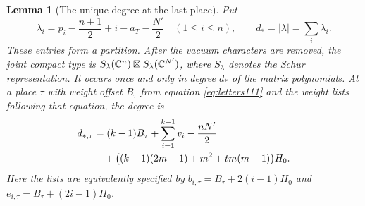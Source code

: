 \documentclass[a4paper,11pt]{article}
\newtheorem{lemma}[proposition]{Lemma}
\theoremstyle{definition}
\theoremstyle{remark}
\numberwithin{equation}{section}
\begin{document}
\begin{lemma}[The unique degree at the last place]
\label{lem:degree181}
Put
\[
 \lambda_i=p_i-\frac{n+1}{2}+i-a_T-\frac{N'}2
       \quad(1\le i\le n),\qquad d_*=|\lambda|=\sum_i\lambda_i.
\]
These entries form a partition. After the vacuum characters
are removed, the joint compact type is
\(S_\lambda(\mathbb C^n)\boxtimes S_\lambda(\mathbb C^{N'})\), where
\(S_\lambda\) denotes the Schur representation. It occurs
once and only in degree \(d_*\) of the matrix polynomials.
At a place \(\tau\) with weight offset \(B_\tau\) from
equation \ref{eq:letters111} and the weight lists following that equation, the degree is
\begin{align}
 d_{*,\tau}
   &=(k-1)B_\tau+\sum_{i=1}^{k-1} v_i-\frac{nN'}2 \notag\\
   &\quad+
       \big((k-1)(2m-1)+m^2+t m(m-1)\big)H_0 .      \label{eq:lastdegree181}
\end{align}
Here the lists are equivalently specified by
\(b_{i,\tau}=B_\tau+2(i-1)H_0\) and
\(e_{i,\tau}=B_\tau+(2i-1)H_0\).
\end{lemma}
\end{document}
